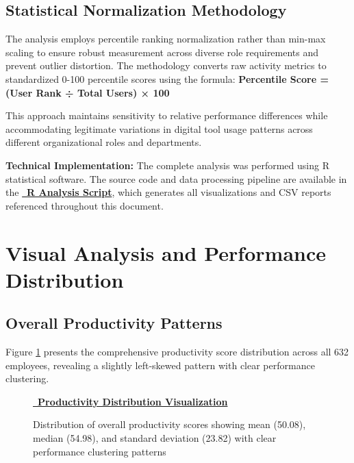 \documentclass[12pt,a4paper]{article}
\newcommand{\styledvislink}[2]{\textcolor{warningAmber}{\href{#1}{{\normalsize\faChartLine}\, \textbf{#2}}}}
\newcommand{\styledimagelink}[2]{\textcolor{accentBlue}{\href{#1}{{\normalsize\faImage}\, \textbf{#2}}}}
\begin{document}
\subsection{Statistical Normalization Methodology}

The analysis employs percentile ranking normalization rather than min-max scaling to ensure robust measurement across diverse role requirements and prevent outlier distortion. The methodology converts raw activity metrics to standardized 0-100 percentile scores using the formula: \textbf{Percentile Score = (User Rank ÷ Total Users) × 100}

This approach maintains sensitivity to relative performance differences while accommodating legitimate variations in digital tool usage patterns across different organizational roles and departments.

\textbf{Technical Implementation:} The complete analysis was performed using R statistical software. The source code and data processing pipeline are available in the \styledvislink{https://fixysaskihumorizijuv.supabase.co/storage/v1/object/public/research-files/57c52545-ee65-4df3-a5c5-210e5d1430c5-R\%20Script.R?download=}{R Analysis Script}, which generates all visualizations and CSV reports referenced throughout this document.

\section{Visual Analysis and Performance Distribution}

\subsection{Overall Productivity Patterns}

Figure \ref{fig:productivity_dist} presents the comprehensive productivity score distribution across all 632 employees, revealing a slightly left-skewed pattern with clear performance clustering.

\begin{figure}[H]
\centering
\styledimagelink{https://fixysaskihumorizijuv.supabase.co/storage/v1/object/public/research-files/187126a0-56ba-4581-a624-1f14be9a7bfa-productivity_distribution.png?download=}{Productivity Distribution Visualization}
\caption{Distribution of overall productivity scores showing mean (50.08), median (54.98), and standard deviation (23.82) with clear performance clustering patterns}
\label{fig:productivity_dist}
\end{figure}
\end{document}
